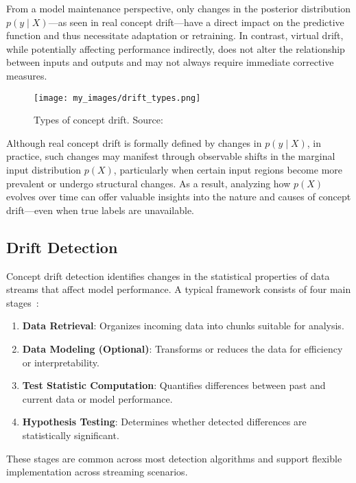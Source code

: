 From a model maintenance perspective, only changes in the posterior
distribution $p(y \mid X)$—as seen in real concept drift—have a direct impact
on the predictive function and thus necessitate adaptation or retraining. In
contrast, virtual drift, while potentially affecting performance indirectly,
does not alter the relationship between inputs and outputs and may not always
require immediate corrective measures.

\begin{figure}[h]
    \centering
    \texttt{[image: my\_images/drift\_types.png]}
    \caption{Types of concept drift. Source:~\cite{drift_adaptation_survey}}\label{fig:concept_drift_types}
\end{figure}

Although real concept drift is formally defined by changes in $p(y \mid X)$, in
practice, such changes may manifest through observable shifts in the marginal
input distribution $p(X)$, particularly when certain input regions become more
prevalent or undergo structural changes. As a result, analyzing how $p(X)$
evolves over time can offer valuable insights into the nature and causes of
concept drift—even when true labels are unavailable.

\subsection*{Drift Detection}\label{subsec:drift_detection}
Concept drift detection identifies changes in the statistical properties of
data streams that affect model performance. A typical framework consists of
four main stages~\cite{learning_under_concept_drift}:

\begin{enumerate}
    \item \textbf{Data Retrieval}: Organizes incoming data into chunks
          suitable for analysis.
    \item \textbf{Data Modeling (Optional)}: Transforms or reduces the data
          for efficiency or interpretability.
    \item \textbf{Test Statistic Computation}: Quantifies differences between
          past and current data or model performance.
    \item \textbf{Hypothesis Testing}: Determines whether detected differences
          are statistically significant.
\end{enumerate}

These stages are common across most detection algorithms and support flexible
implementation across streaming scenarios.

